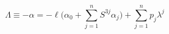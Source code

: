 \begin{equation}
\Lambda \equiv - \alpha = -\ell \Big( \alpha_0 + \sum_{j=1}^n S^{3j} \alpha_j \Big) 
                  +  \sum_{j=1}^n p_j \lambda^j
\end{equation}

